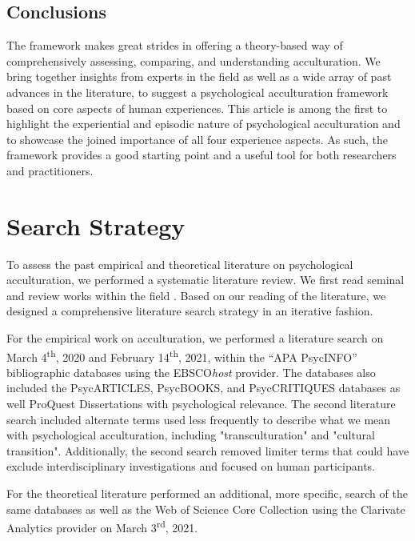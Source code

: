\documentclass[man, 12pt, a4paper, mask]{apa7}
\begin{document}
\subsection{Conclusions}
The framework makes great strides in offering a theory-based way of comprehensively assessing, comparing, and understanding acculturation.
We bring together insights from experts in the field as well as a wide array of past advances in the literature, to suggest a psychological acculturation framework based on core aspects of human experiences.
This article is among the first to highlight the experiential and episodic nature of psychological acculturation and to showcase the joined importance of all four experience aspects. 
As such, the framework provides a good starting point and a useful tool for both researchers and practitioners. 


\printbibliography

\appendix

\section{Search Strategy}
\label{app:AppendixSearchStrategy}

To assess the past empirical and theoretical literature on psychological acculturation, we performed a systematic literature review. We first read seminal and review works within the field \citep[including,][]{Ward2019, Berry1997b, Berry2003, Szapocznik1978, Sam2006a, Rudmin2003a}. Based on our reading of the literature, we designed a comprehensive literature search strategy in an iterative fashion. 

For the empirical work on acculturation, we performed a literature search on March 4\textsuperscript{th}, 2020 and February 14\textsuperscript{th}, 2021, within the ``APA PsycINFO'' bibliographic databases using the EBSCO\textit{host} provider. The databases also included the PsycARTICLES, PsycBOOKS, and PsycCRITIQUES databases as well ProQuest Dissertations with psychological relevance. The second literature search included alternate terms used less frequently to describe what we mean with psychological acculturation, including "transculturation" and "cultural transition". Additionally, the second search removed limiter terms that could have exclude interdisciplinary investigations and focused on human participants.

For the theoretical literature performed an additional, more specific, search of the same databases as well as the Web of Science Core Collection using the Clarivate Analytics provider on March 3\textsuperscript{rd}, 2021.
\end{document}
